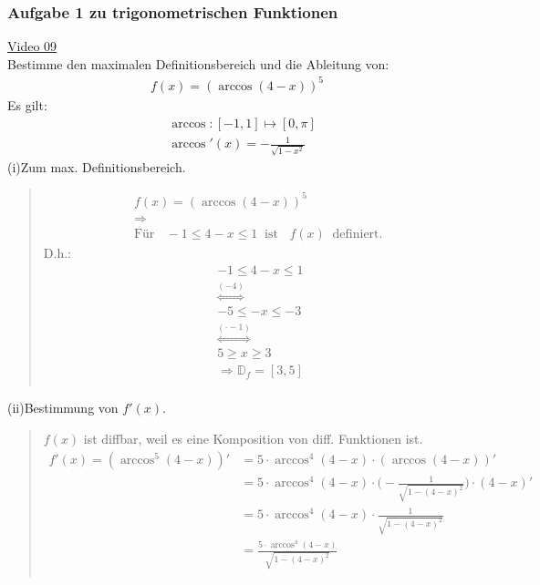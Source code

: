 \subsubsection{Aufgabe 1 zu trigonometrischen Funktionen}
\href{https://youtu.be/voAHLA8F08c}{Video 09}\\
Bestimme den maximalen Definitionsbereich und die Ableitung von:\\
\begin{align*}
f(x)=(\arccos(4-x))^5
\end{align*}
Es gilt:\\
\begin{align*}
&\arccos: [-1,1]\longmapsto [0,\pi]\\
&\arccos'(x)=-\frac{1}{\sqrt{1-x^2}}
\end{align*}
(i)\;\;Zum max. Definitionsbereich.\\
\begin{quote}
	\begin{align*}
	&f(x)=(\arccos(4-x))^5\\
	&\Rightarrow\\
	&\text{Für }\;\;-1\leq 4-x\leq 1\;\;\text{ist }\;\;f(x)\;\;\text{definiert. }
	\end{align*}
	D.h.:\\
	\begin{align*}
	&-1\leq 4-x\leq 1\\
	&\overset{(-4)}{\Leftrightarrow}\\
	&-5\leq -x\leq -3\\
	&\overset{(\cdot -1)}{\Leftrightarrow}\\
	&5\geq x\geq 3\\
	&\Rightarrow\mathbb{D}_f=[3,5]\\
	\end{align*}
\end{quote}
(ii)\;\;Bestimmung von $ f'(x) $.\\
\begin{quote}
	$ f(x) $ ist diffbar, weil es eine Komposition von diff. Funktionen ist.\\
	\begin{align*}
	f'(x)=(\arccos^5(4-x))'&=5\cdot \arccos^4(4-x)\cdot(\arccos(4-x))'\\
	&=5\cdot \arccos^4(4-x)\cdot\bigg(-\frac{1}{\sqrt{1-(4-x)^2}}\bigg)\cdot(4-x)'\\
	&=5\cdot \arccos^4(4-x)\cdot\frac{1}{\sqrt{1-(4-x)^2}}\\
	&=\frac{5\cdot \arccos^4(4-x)}{\sqrt{1-(4-x)^2}}\\
	\end{align*}
\end{quote}
